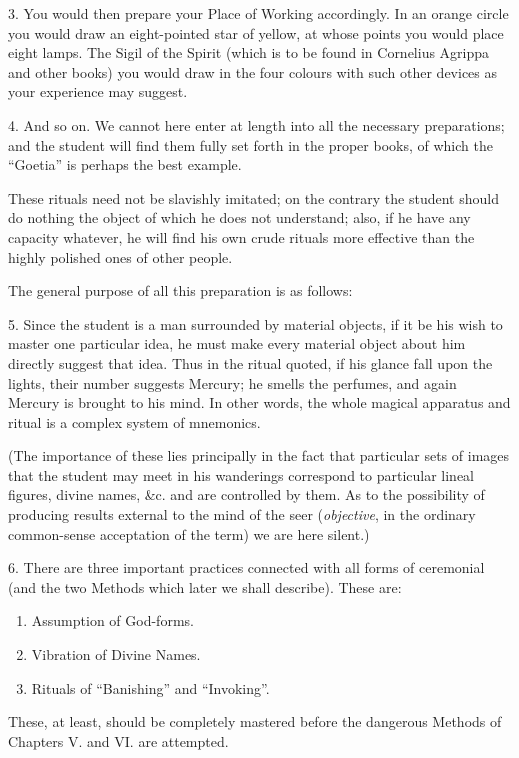 3. You would then prepare your Place of Working accordingly. In an orange circle you would draw an eight-pointed star of yellow, at whose points you would place eight lamps. The Sigil of the Spirit (which is to be found in Cornelius Agrippa and other books) you would draw in the four colours with such other devices as your experience may suggest.

4. And so on. We cannot here enter at length into all the necessary preparations; and the student will find them fully set forth in the proper books, of which the \enquote{Goetia} is perhaps the best example.

These rituals need not be slavishly imitated; on the contrary the student should do nothing the object of which he does not understand; also, if he have any capacity whatever, he will find his own crude rituals more effective than the highly polished ones of other people.

The general purpose of all this preparation is as follows:

5. Since the student is a man surrounded by material objects, if it be his wish to master one particular idea, he must make every material object about him directly suggest that idea. Thus in the ritual quoted, if his glance fall upon the lights, their number suggests Mercury; he smells the perfumes, and again Mercury is brought to his mind. In other words, the whole magical apparatus and ritual is a complex system of mnemonics.

(The importance of these lies principally in the fact that particular sets of images that the student may meet in his wanderings correspond to particular lineal figures, divine names, \&c. and are controlled by them. As to the possibility of producing results external to the mind of the seer (\textit{objective}, in the ordinary common-sense acceptation of the term) we are here silent.)

6. There are three important practices connected with all forms of ceremonial (and the two Methods which later we shall describe). These are:

\begin{enumerate}[label=(\arabic*)]
\item Assumption of God-forms.
\item Vibration of Divine Names.
\item Rituals of \enquote{Banishing} and \enquote{Invoking}.
\end{enumerate}

These, at least, should be completely mastered before the dangerous Methods of Chapters V. and VI. are attempted.

